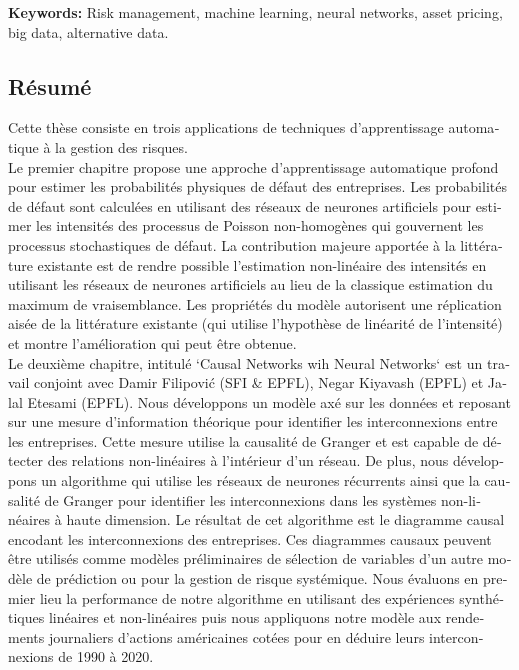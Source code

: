 \textbf{Keywords:} Risk management, machine learning, neural networks, asset pricing, big data, alternative data.

\begin{otherlanguage}{french}
\cleardoublepage
\chapter*{Résumé}

Cette thèse consiste en trois applications de techniques d'apprentissage automatique à la gestion des risques. \\

Le premier chapitre propose une approche d'apprentissage automatique profond pour estimer les probabilités physiques de défaut des entreprises. Les probabilités de défaut sont calculées en utilisant des réseaux de neurones artificiels pour estimer les intensités des processus de Poisson non-homogènes qui gouvernent les processus stochastiques de défaut. La contribution majeure apportée à la littérature existante est de rendre possible l'estimation non-linéaire des intensités en utilisant les réseaux de neurones artificiels au lieu de la classique estimation du maximum de vraisemblance. Les propriétés du modèle autorisent une réplication aisée de la littérature existante (qui utilise l'hypothèse de linéarité de l'intensité) et montre l'amélioration qui peut être obtenue. \\

Le deuxième chapitre, intitulé `Causal Networks wih Neural Networks` est un travail conjoint avec Damir Filipović (SFI \& EPFL), Negar Kiyavash (EPFL) et Jalal Etesami (EPFL). Nous développons un modèle axé sur les données et reposant sur une mesure d'information théorique pour identifier les interconnexions entre les entreprises. Cette mesure utilise la causalité de Granger et est capable de détecter des relations non-linéaires à l'intérieur d'un réseau. De plus, nous développons un algorithme qui utilise les réseaux de neurones récurrents ainsi que la causalité de Granger pour identifier les interconnexions dans les systèmes non-linéaires à haute dimension. Le résultat de cet algorithme est le diagramme causal encodant les interconnexions des entreprises. Ces diagrammes causaux peuvent être utilisés comme modèles préliminaires de sélection de variables d'un autre modèle de prédiction ou pour la gestion de risque systémique. Nous évaluons en premier lieu la performance de notre algorithme en utilisant des expériences synthétiques linéaires et non-linéaires puis nous appliquons notre modèle aux rendements journaliers d'actions américaines cotées pour en déduire leurs interconnexions de 1990 à 2020. \\


\end{otherlanguage}
